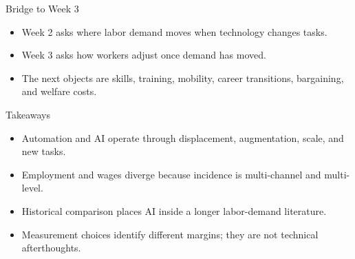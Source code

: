\documentclass[aspectratio=169,11pt]{beamer}
\begin{document}
\begin{frame}{Bridge to Week 3}
\begin{itemize}
    \item Week 2 asks where labor demand moves when technology changes tasks.
    \item Week 3 asks how workers adjust once demand has moved.
    \item The next objects are skills, training, mobility, career transitions, bargaining, and welfare costs.
\end{itemize}
\end{frame}

\begin{frame}{Takeaways}
\begin{itemize}
    \item Automation and AI operate through displacement, augmentation, scale, and new tasks.
    \item Employment and wages diverge because incidence is multi-channel and multi-level.
    \item Historical comparison places AI inside a longer labor-demand literature.
    \item Measurement choices identify different margins; they are not technical afterthoughts.
\end{itemize}
\end{frame}
\end{document}
